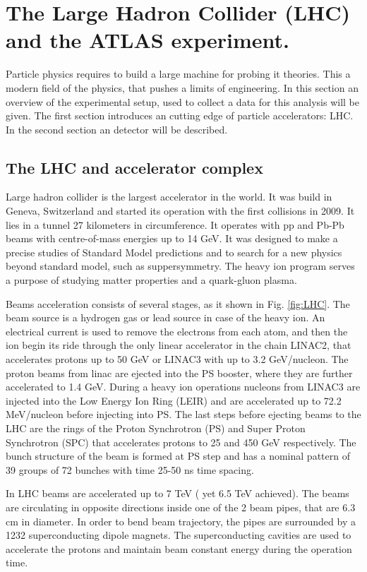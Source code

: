 \chapter{The Large Hadron Collider (LHC) and the ATLAS experiment.}
\minitoc

Particle physics requires to build a large machine for probing it theories. This a modern field of the physics, that pushes a limits of engineering. In this section an overview of the experimental setup, used to collect a data for this analysis will be given. The first section introduces an cutting edge of particle accelerators: LHC. In the second section an \atlas detector will be described. 

\section{The LHC and accelerator complex}

Large hadron collider is the largest accelerator in the world. It was build in Geneva, Switzerland and started its operation with the first collisions in 2009. It lies in a tunnel 27 kilometers in circumference. It operates with pp and Pb-Pb beams with centre-of-mass energies up to 14 GeV. It was designed to make a precise studies of Standard Model predictions and to search for a new physics beyond standard model, such as suppersymmetry. The heavy ion program serves a purpose of studying matter properties and a quark-gluon plasma.

Beams acceleration consists of several stages\cite{LHCMachine}, as it shown in Fig. \ref{fig:LHC}. The beam source is a hydrogen gas or lead source in case of the heavy ion.  An electrical current is used to remove the electrons from each atom, and then the ion begin its ride through the only linear accelerator in the chain LINAC2, that accelerates protons up to 50 GeV or LINAC3 with up to 3.2 GeV/nucleon. The proton beams from linac are ejected into the PS booster, where they are further accelerated to 1.4 GeV.  During a heavy ion operations nucleons from LINAC3 are injected into the Low Energy Ion Ring (LEIR) and are accelerated up to 72.2 MeV/nucleon before injecting into PS.  The last steps before ejecting beams to the LHC are the rings of the Proton Synchrotron (PS) and Super Proton Synchrotron (SPC) that accelerates protons to 25 and 450 GeV respectively. The bunch structure of the beam is formed at PS step and has a nominal pattern of 39 groups of 72 bunches with time 25-50 ns time spacing. 

In LHC beams are accelerated up to 7 TeV ( yet 6.5 TeV achieved). The beams are circulating in opposite directions inside one of the 2 beam pipes, that are 6.3 cm in diameter. In order to bend beam trajectory, the pipes are surrounded by a 1232 superconducting dipole magnets. The superconducting cavities are used to accelerate the protons and maintain beam constant energy during the operation time. 

